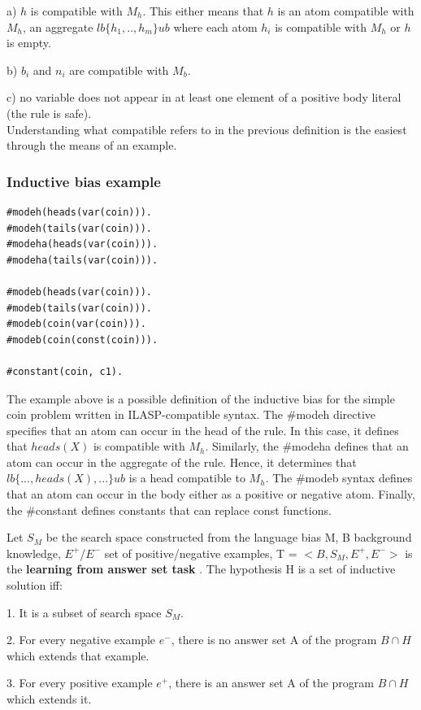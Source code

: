  a) $h$ is compatible with $M_h$. This either means that $h$ is an atom compatible with $M_h$, an aggregate $lb\{h_1,.., h_m\}ub$ where each atom $h_i$ is compatible with $M_h$ or $h$ is empty.
 
 b) $b_i$ and $n_i$ are compatible with $M_b$.
 
 c) no variable does not appear in at least one element  of a positive body literal (the rule is safe). \\ 
 
Understanding what compatible refers to in the previous definition is the easiest through the means of an example.

\subsubsection{Inductive bias example}
\begin{verbatim}
#modeh(heads(var(coin))).
#modeh(tails(var(coin))).
#modeha(heads(var(coin))).
#modeha(tails(var(coin))).

#modeb(heads(var(coin))).
#modeb(tails(var(coin))).
#modeb(coin(var(coin))).
#modeb(coin(const(coin))).

#constant(coin, c1).
\end{verbatim}

The example above is a possible definition of the inductive bias for the simple coin problem written in ILASP-compatible syntax.
The \#modeh directive specifies that an atom can occur in the head of the rule. In this case, it defines that $heads(X)$ is compatible with $M_h$.
Similarly, the \#modeha defines that an atom can occur in the aggregate of the rule. Hence, it determines that  $lb\{..., heads(X), ...\}ub$ is a head compatible to $M_h$.
The \#modeb syntax defines that an atom can occur in the body either as a positive or negative atom.
Finally, the \#constant defines constants that can replace const functions.

Let $S_M$ be the search space constructed from the language bias M, B background knowledge, $E^+$/$E^-$ set of positive/negative examples, T = $<B, S_M, E^+, E^->$ is the \textbf{learning from answer set task} \cite{RefWorks:RefID:47-law2014inductive}.
The hypothesis H is a set of inductive solution iff:

1. It is a subset of search space $S_M$.

2. For every negative example $e^-$, there is no answer set A of the program $B \cap H$ which extends that example.

3. For every positive example $e^+$, there is an answer set A of the program $B \cap H$ which extends it.
\\

